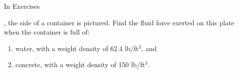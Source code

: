 {\noindent In Exercises}
{, the side of a container is pictured. Find the fluid force exerted on this plate when the container is full of:
	\begin{enumerate}
	\item		water, with a weight density of 62.4 lb/ft$^3$, and
	\item		concrete, with a weight density of 150 lb/ft$^3$.
	\end{enumerate}
}
